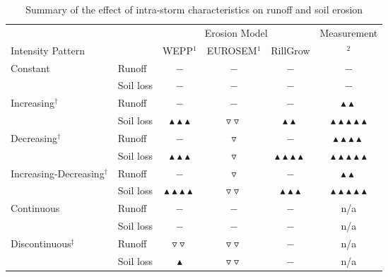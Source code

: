 \begin{sidewaystable}[htbp]
  \centering
  \caption{Summary of the effect of intra-storm characteristics on runoff and
soil erosion}
  \label{tab:SimulationSummary}
    \begin{tabular}{llcccc}
    \toprule
    & & \multicolumn{3}{c}{Erosion Model} & Measurement \\
    \cmidrule(rl){3-5} \cmidrule(rl){6-6}
    Intensity Pattern & & WEPP$^1$ & EUROSEM$^1$ & RillGrow &
\citet{parsons2006-68}$^2$\\
    \midrule
    \midrule
    Constant & Runoff & $-$ & $-$ & $-$ & $-$ \\
             & Soil loss & $-$ & $-$ & $-$ & $-$ \\
    \midrule
    Increasing$^\dagger$ & Runoff & $-$ & $-$ & $-$ &
$\blacktriangle\blacktriangle$ \\
                         & Soil loss &
$\blacktriangle\blacktriangle\blacktriangle$ & $\triangledown\triangledown$
& $\blacktriangle\blacktriangle$ &
$\blacktriangle\blacktriangle\blacktriangle\blacktriangle\blacktriangle$ \\
    \midrule
    Decreasing$^\dagger$ & Runoff & $-$ & $\triangledown$ & $-$ &
$\blacktriangle\blacktriangle\blacktriangle\blacktriangle$\\
                         & Soil loss &
$\blacktriangle\blacktriangle\blacktriangle$ & $\triangledown$ &
$\blacktriangle\blacktriangle\blacktriangle\blacktriangle$ &
$\blacktriangle\blacktriangle\blacktriangle\blacktriangle\blacktriangle$ \\
    \midrule
    Increasing-Decreasing$^\dagger$ & Runoff & $-$ & $\triangledown$ & $-$ &
$\blacktriangle\blacktriangle$ \\
                                    & Soil loss &
$\blacktriangle\blacktriangle\blacktriangle\blacktriangle$ &
$\triangledown\triangledown$ & $\blacktriangle\blacktriangle\blacktriangle$
& $\blacktriangle\blacktriangle\blacktriangle\blacktriangle\blacktriangle$ \\
    \midrule
    \midrule
    Continuous & Runoff & $-$ & $-$ & $-$ & n/a \\
               & Soil loss & $-$ & $-$ & $-$ & n/a \\
    \midrule
    Discontinuous$^\ddagger$ & Runoff & $\triangledown\triangledown$ &
$\triangledown\triangledown$ & $-$ & n/a \\
                             & Soil loss & $\blacktriangle$&
$\triangledown\triangledown$ & $-$ & n/a\\

\end{tabular}
\end{sidewaystable}
